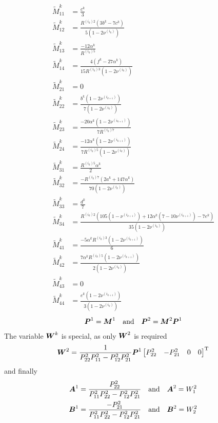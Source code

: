 \begin{align}
	\widetilde{M}^k_{11} &= \frac{c^k}{3} \\
	\widetilde{M}^k_{12} &= \frac{R^{(i_k)2}(3b^k-7c^k)}{5(1-2\nu^{(i_k)})} \\
	\widetilde{M}^k_{13} &= \frac{-12\alpha^k}{R^{(i_k)5}} \\
	\widetilde{M}^k_{14} &= \frac{4(f^k-27\alpha^k)}{15R^{(i_k)3}(1-2\nu^{(i_{k})})} \\
	\widetilde{M}^k_{21} &= 0 \\
	\widetilde{M}^k_{22} &= \frac{b^k(1-2\nu^{(i_{k+1})})}{7(1-2\nu^{(i_{k})})} \\
	\widetilde{M}^k_{23} &= \frac{-20\alpha^k(1-2\nu^{(i_{k+1})})}{7R^{(i_{k})7}} \\
	\widetilde{M}^k_{24} &= \frac{-12\alpha^k(1-2\nu^{(i_{k+1})})}{7R^{(i_{k})5}(1-2\nu^{(i_{k})})} \\
	\widetilde{M}^k_{31} &= \frac{R^{(i_{k})5}\alpha^k}{2} \\
	\widetilde{M}^k_{32} &= \frac{-R^{(i_{k})7}(2a^k+147\alpha^k)}{70(1-2\nu^{(i_{k})})} \\
	\widetilde{M}^k_{33} &= \frac{d^k}{7} \\
	\widetilde{M}^k_{34} &= \frac{R^{(i_{k})2}(105(1-\nu^{(i_{k+1})})+12\alpha^k(7-10\nu^{(i_{k+1})})-7e^k)}{35(1-2\nu^{(i_{k})})} \\
	\widetilde{M}^k_{41} &= \frac{-5\alpha^kR^{(i_{k})3}(1-2\nu^{(i_{k+1})})}{6} \\
	\widetilde{M}^k_{42} &= \frac{7\alpha^kR^{(i_{k})5}(1-2\nu^{(i_{k+1})})}{2(1-2\nu^{(i_{k})})} \\
	\widetilde{M}^k_{43} &=  0\\
	\widetilde{M}^k_{44} &= \frac{e^k(1-2\nu^{(i_{k+1})})}{3(1-2\nu^{(i_{k})})} 
\end{align}
\begin{align}
	\boldsymbol{P}^{1} = \boldsymbol{M}^1 \quad \text{and}\quad \boldsymbol{P}^2 = \boldsymbol{M}^2 \boldsymbol{P}^1
\end{align}
The variable $\boldsymbol{W}^k$ is special, as only $\boldsymbol{W}^2$ is required
\begin{align}
	\boldsymbol{W}^2 = \frac{1}{P^{2}_{22}P^{2}_{11}-P^{2}_{12}P^{2}_{21}} \boldsymbol{P}^{1} 
	\begin{bmatrix}
		P^{2}_{22}&
		-P^{2}_{21}&
		0&
		0
	\end{bmatrix}^{\text{T}}
\end{align}
and finally 
\begin{align}
	\boldsymbol{A}^1 = \dfrac{P^{2}_{22}}{P^{2}_{11}P^{2}_{22} - P^{2}_{12}P^{2}_{21}}\quad&\text{and}\quad
	\boldsymbol{A}^2 = W^2_1\\
	\boldsymbol{B}^1 = \dfrac{-P^{2}_{21}}{P^{2}_{11}P^{2}_{22} - P^{2}_{12}P^{2}_{21}}\quad&\text{and}\quad
	\boldsymbol{B}^2 = W^2_2
\end{align}
